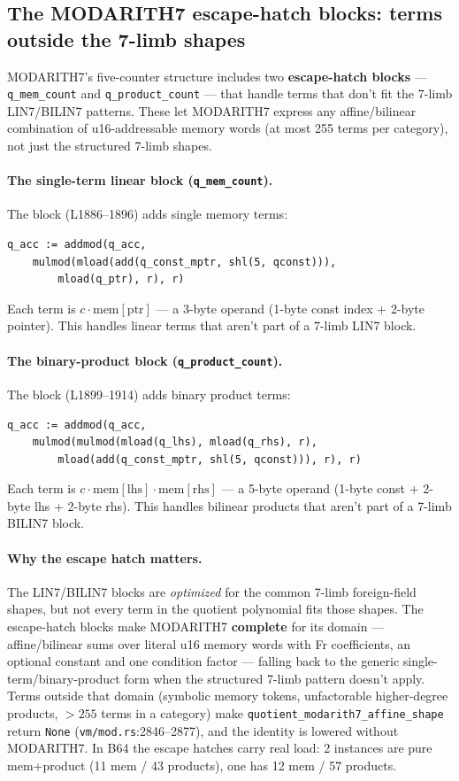 \subsection{The MODARITH7 escape-hatch blocks: terms outside the 7-limb shapes}
\label{sec:pr-escapehatch}

MODARITH7's five-counter structure includes two
\textbf{escape-hatch blocks} --- \texttt{q\_mem\_count} and
\texttt{q\_product\_count} --- that handle terms that don't fit
the 7-limb LIN7/BILIN7 patterns. These let MODARITH7 express
any affine/bilinear combination of u16-addressable memory words
(at most 255 terms per category), not just the structured 7-limb
shapes.

\paragraph{The single-term linear block (\texttt{q\_mem\_count}).}
The block (L1886--1896) adds single memory terms:
\begin{lstlisting}[style=yul]
q_acc := addmod(q_acc,
    mulmod(mload(add(q_const_mptr, shl(5, qconst))),
        mload(q_ptr), r), r)
\end{lstlisting}
Each term is $c \cdot \text{mem}[\text{ptr}]$ --- a 3-byte
operand (1-byte const index + 2-byte pointer). This handles
linear terms that aren't part of a 7-limb LIN7 block.

\paragraph{The binary-product block (\texttt{q\_product\_count}).}
The block (L1899--1914) adds binary product terms:
\begin{lstlisting}[style=yul]
q_acc := addmod(q_acc,
    mulmod(mulmod(mload(q_lhs), mload(q_rhs), r),
        mload(add(q_const_mptr, shl(5, qconst))), r), r)
\end{lstlisting}
Each term is $c \cdot \text{mem}[\text{lhs}] \cdot
\text{mem}[\text{rhs}]$ --- a 5-byte operand (1-byte const +
2-byte lhs + 2-byte rhs). This handles bilinear products that
aren't part of a 7-limb BILIN7 block.

\paragraph{Why the escape hatch matters.} The LIN7/BILIN7 blocks
are \emph{optimized} for the common 7-limb foreign-field shapes,
but not every term in the quotient polynomial fits those shapes.
The escape-hatch blocks make MODARITH7 \textbf{complete} for
its domain --- affine/bilinear sums over literal u16 memory words
with Fr coefficients, an optional constant and one condition
factor --- falling back to the generic single-term/binary-product
form when the structured 7-limb pattern doesn't apply. Terms
outside that domain (symbolic memory tokens, unfactorable
higher-degree products, $>255$ terms in a category) make
\texttt{quotient\_\allowbreak{}modarith7\_\allowbreak{}affine\_\allowbreak{}shape} return \texttt{None}
(\texttt{vm/mod.rs}:2846--2877), and the identity is lowered
without MODARITH7. In B64 the escape hatches carry real load: 2
instances are pure mem+product (11 mem / 43 products), one has 12
mem / 57 products.

